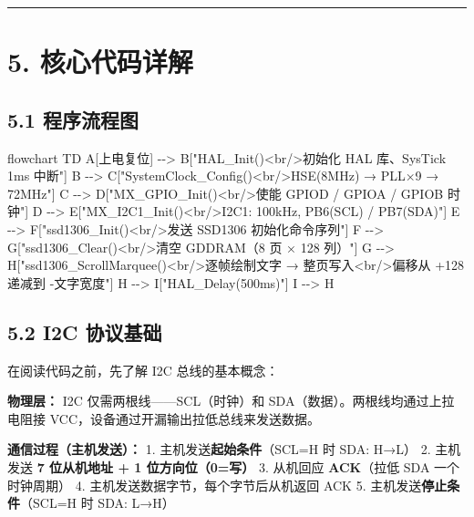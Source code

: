 \documentclass[
  chinese,
  UTF8,
  oneside,
  openany]{ctexbook}
\newenvironment{Shaded}{}{}
\newcommand{\NormalTok}[1]{#1}
\begin{document}
\begin{center}\rule{0.5\linewidth}{0.5pt}\end{center}

\section{5. 核心代码详解}\label{ux6838ux5fc3ux4ee3ux7801ux8be6ux89e3-2}

\subsection{5.1 程序流程图}\label{ux7a0bux5e8fux6d41ux7a0bux56fe-2}

\begin{Shaded}
\begin{Highlighting}[]
\NormalTok{flowchart TD}
\NormalTok{    A[上电复位] {-}{-}\textgreater{} B["HAL\_Init()\textless{}br/\textgreater{}初始化 HAL 库、SysTick 1ms 中断"]}
\NormalTok{    B {-}{-}\textgreater{} C["SystemClock\_Config()\textless{}br/\textgreater{}HSE(8MHz) → PLL×9 → 72MHz"]}
\NormalTok{    C {-}{-}\textgreater{} D["MX\_GPIO\_Init()\textless{}br/\textgreater{}使能 GPIOD / GPIOA / GPIOB 时钟"]}
\NormalTok{    D {-}{-}\textgreater{} E["MX\_I2C1\_Init()\textless{}br/\textgreater{}I2C1: 100kHz, PB6(SCL) / PB7(SDA)"]}
\NormalTok{    E {-}{-}\textgreater{} F["ssd1306\_Init()\textless{}br/\textgreater{}发送 SSD1306 初始化命令序列"]}
\NormalTok{    F {-}{-}\textgreater{} G["ssd1306\_Clear()\textless{}br/\textgreater{}清空 GDDRAM（8 页 × 128 列）"]}
\NormalTok{    G {-}{-}\textgreater{} H["ssd1306\_ScrollMarquee()\textless{}br/\textgreater{}逐帧绘制文字 → 整页写入\textless{}br/\textgreater{}偏移从 +128 递减到 {-}文字宽度"]}
\NormalTok{    H {-}{-}\textgreater{} I["HAL\_Delay(500ms)"]}
\NormalTok{    I {-}{-}\textgreater{} H}
\end{Highlighting}
\end{Shaded}

\subsection{5.2 I2C 协议基础}\label{i2c-ux534fux8baeux57faux7840}

在阅读代码之前，先了解 I2C 总线的基本概念：

\textbf{物理层：} I2C 仅需两根线------SCL（时钟）和
SDA（数据）。两根线均通过上拉电阻接
VCC，设备通过开漏输出拉低总线来发送数据。

\textbf{通信过程（主机发送）：} 1. 主机发送\textbf{起始条件}（SCL=H 时
SDA: H→L） 2. 主机发送 \textbf{7 位从机地址 + 1 位方向位（0=写）} 3.
从机回应 \textbf{ACK}（拉低 SDA 一个时钟周期） 4.
主机发送数据字节，每个字节后从机返回 ACK 5.
主机发送\textbf{停止条件}（SCL=H 时 SDA: L→H）
\end{document}
